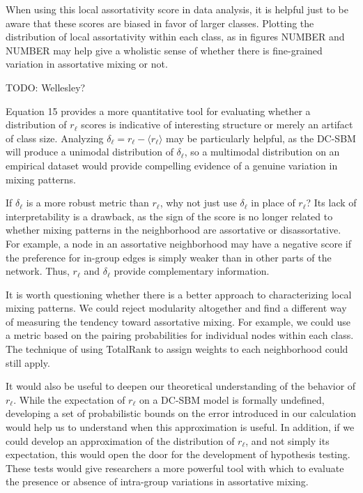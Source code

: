 \documentclass[12pt]{article}
\begin{document}
When using this local assortativity score in data analysis, it is helpful just to be aware that these scores are biased in favor of larger classes.  Plotting the distribution of local assortativity within each class, as in figures NUMBER and NUMBER may help give a wholistic sense of whether there is fine-grained variation in assortative mixing or not.

TODO: Wellesley?

Equation 15 provides a more quantitative tool for evaluating whether a distribution of $r_\ell$ scores is indicative of interesting structure or merely an artifact of class size.  Analyzing $\delta_\ell = r_\ell - \langle r_\ell \rangle$ may be particularly helpful, as the DC-SBM will produce a unimodal distribution of $\delta_\ell$, so a multimodal distribution on an empirical dataset would provide compelling evidence of a genuine variation in mixing patterns.

If $\delta_\ell$ is a more robust metric than $r_\ell$, why not just use $\delta_\ell$ in place of $r_\ell$?  Its lack of interpretability is a drawback, as the sign of the score is no longer related to whether mixing patterns in the neighborhood are assortative or disassortative.  For example, a node in an assortative neighborhood may have a negative score if the preference for in-group edges is simply weaker than in other parts of the network.  Thus, $r_\ell$ and $\delta_\ell$ provide complementary information. 

It is worth questioning whether there is a better approach to characterizing local mixing patterns.  We could reject modularity altogether and find a different way of measuring the tendency toward assortative mixing.  For example, we could use a metric based on the pairing probabilities for individual nodes within each class.  The technique of using TotalRank to assign weights to each neighborhood could still apply.

It would also be useful to deepen our theoretical understanding of the behavior of $r_\ell$.  While the expectation of $r_\ell$ on a DC-SBM model is formally undefined, developing a set of probabilistic bounds on the error introduced in our calculation would help us to understand when this approximation is useful.  In addition, if we could develop an approximation of the distribution of $r_\ell$, and not simply its expectation, this would open the door for the development of hypothesis testing.  These tests would give researchers a more powerful tool with which to evaluate the presence or absence of intra-group variations in assortative mixing.
\end{document}
